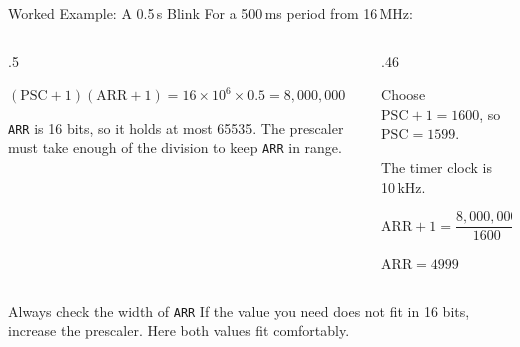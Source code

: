 \documentclass[9pt,aspectratio=169,xcolor=table]{beamer}
\begin{document}
\begin{frame}{Worked Example: A 0.5\,s Blink}
    \leavevmode
    {\small For a 500\,ms period from 16\,MHz:}

    \vspace{1mm}
    \begin{columns}[T]
    \begin{column}{.5\textwidth}
        {\small
        $(\text{PSC}+1)(\text{ARR}+1) = 16\times10^{6}\times 0.5 = 8{,}000{,}000$

        \vspace{2mm}
        \texttt{ARR} is 16 bits, so it holds at most 65535. The prescaler must take enough of the division to keep \texttt{ARR} in range.}
    \end{column}
    \begin{column}{.46\textwidth}
        {\small
        Choose $\text{PSC}+1 = 1600$, so $\text{PSC} = 1599$.

        \vspace{1mm}
        The timer clock is 10\,kHz.

        \vspace{1mm}
        $\text{ARR}+1 = \dfrac{8{,}000{,}000}{1600} = 5000$

        \vspace{1mm}
        \alert{$\text{ARR} = 4999$}}
    \end{column}
    \end{columns}

    \vspace{3mm}
    \begin{block}{Always check the width of \texttt{ARR}}
        If the value you need does not fit in 16 bits, \alert{increase the prescaler}. Here both values fit comfortably.
    \end{block}
\end{frame}
\end{document}
